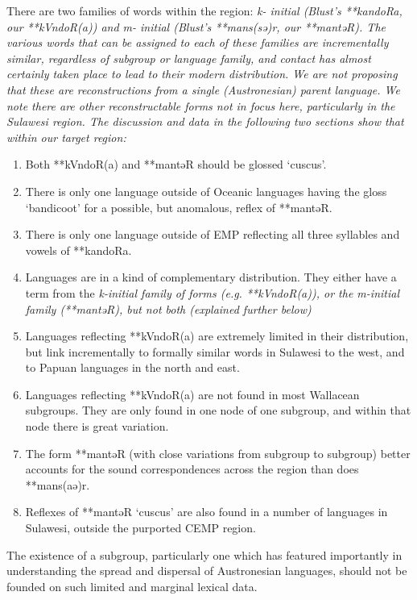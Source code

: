 There are two families of words within the region: \it{k-} initial
(Blust’s **kandoRa, our **kVndoR(a)) and \it{m-} initial (Blust’s **mans(sə)r, our **mantəR).
The various words that can be assigned to each of these families
are incrementally similar, regardless of subgroup or language family,
and contact has almost certainly taken place to lead to their modern distribution.
We are not proposing that these are reconstructions from a single (Austronesian) parent language.
We note there are other reconstructable forms not in focus here,
particularly in the Sulawesi region.
The discussion and data in the following two sections show that
within our target region:

\newpage
\begin{enumerate}
	\item	Both **kVndoR(a)
				and **mantəR should be glossed ‘cuscus’.
	\item	There is only one language outside of Oceanic languages
				having the gloss ‘bandicoot’ for a possible,
				but anomalous, reflex of **mantəR.
	\item	There is only one language outside of EMP reflecting all
				three syllables and vowels of **kandoRa.
	\item	Languages are in a kind of complementary distribution. They either
				have a term from the \it{k-}initial family of forms (e.g.
				**kVndoR(a)), or the \it{m-}initial family (**mantəR),
				but not both (explained further below)
	\item	Languages reflecting **kVndoR(a) are extremely limited
				in their distribution, but link incrementally to formally similar words in Sulawesi
				to the west, and to Papuan languages in the north and east.
	\item	Languages reflecting **kVndoR(a) are not found in most Wallacean subgroups.
				They are only found in one node of one subgroup,
				and within that node there is great variation.
	\item	The form **mantəR (with close variations from subgroup
				to subgroup) better accounts for the sound correspondences across
				the region than does **mans(aə)r.
	\item	Reflexes of **mantəR ‘cuscus’ are also found in a number
				of languages in Sulawesi,
				outside the purported CEMP region.
\end{enumerate}

The existence of a subgroup,
particularly one which has featured importantly in understanding
the spread and dispersal of Austronesian languages,
should not be founded on such limited
and marginal lexical data.

